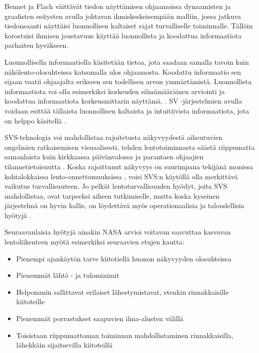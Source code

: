 \documentclass[utf8,bachelor,manualbib]{gradu3}
\begin{document}
Bennet ja Flach \citeyearpar{bennetflach1994} väittävät tiedon näyttämisen ohjaamoissa dynaamisten ja graafisten esitysten avulla johtavan ihmiskeskeisempään malliin, jossa jatkuva tiedonsaanti näyttäisi luonnollisen kaltaiset rajat turvalliselle toiminnalle. Tällöin korostuisi ihmisen joustavuus käyttää luonnollista ja koodattua informaatiota parhaiten hyväkseen.

Luonnollisella informaatiolla käsitetään tietoa, jota saadaan samalla tavoin kuin näkölento-olosuhteissa katsomalla ulos ohjaamosta. Koodattu informaatio sen sijaan vaatii ohjaajalta erikseen sen todellisen arvon ymmärtämistä. Luonnollista informaatiota voi olla esimerkiksi korkeuden silmämääräinen arviointi ja koodattua informaatiota korkeusmittarin näyttämä. \citep{prinzel2004}. SV -järjestelmien avulla voidaan esittää tällaista luonnollisen kaltaista ja intuitiivista informaatiota, jota on helppo käsitellä \citep{wickensandre1990}.

SVS-teknologia voi mahdollistaa rajoitetusta näkyvyydestä aiheutuvien ongelmien ratkaisemisen visuaalisesti, tehden lentotoiminnasta säästä riippumatta samanlaista kuin kirkkaassa päivänvalossa ja parantaen ohjaajien tilannetietoisuutta \citep{prinzel2004}. Koska rajoittunut näkyvyys on suurimpana tekijänä monissa kohtalokkaissa lento-onnettomuuksissa \citep{boeing1996}, voisi SVS:n käytöllä olla merkittävä vaikutus turvallisuuteen. Jo pelkät lentoturvallisuuden hyödyt, joita SVS mahdollistaa, ovat tarpeeksi aiheen tutkimiselle, mutta koska kyseinen järjestelmä on hyvin kallis, on löydettävä myös operationaalisia ja taloudellisia hyötyjä \citep{prinzel2004}.

Seuraavanlaisia hyötyjä ainakin NASA \citeyearpar{williamsym2001} arvioi voitavan saavuttaa kasvavan lentoliikenteen myötä esimerkiksi seuraavien etujen kautta:

\begin{itemize}
\item Pienempi ajankäytön tarve kiitotiellä huonon näkyvyyden olosuhteissa
\item Pienemmät lähtö - ja tulominimit
\item Helpommin sallittavat erilaiset lähestymistavat, etenkin rinnakkaisille kiitoteille
\item Pienemmät porrastukset saapuvien ilma-alusten välillä
\item Toisistaan riippumattoman toiminnan mahdollistaminen rinnakkaisilla, lähekkäin sijaitsevilla kiitoteillä
\end{itemize} 
\end{document}
